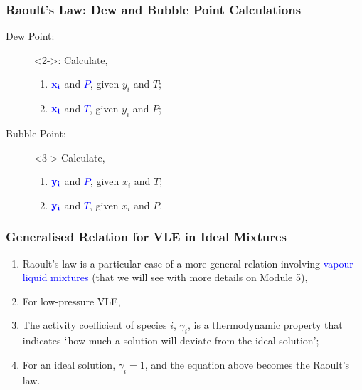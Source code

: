 \documentclass[10pt,compress,handout,ignorenonframetext,unknownkeysallowed]{beamer}
\begin{document}
\begin{frame}
  \frametitle{Raoult's Law: Dew and Bubble Point Calculations}
  \begin{description}
      \item[Dew Point:]<2->: Calculate, 
           \begin{enumerate}
               \item<2-> $\textcolor{blue}{\bf x_{i}}$ and \textcolor{blue}{$P$}, given $y_{i}$ and $T$;
               \item<2-> $\textcolor{blue}{\bf x_{i}}$ and \textcolor{blue}{$T$}, given $y_{i}$ and $P$;
           \end{enumerate}
      \item[Bubble Point:]<3-> Calculate, 
           \begin{enumerate}
               \item<3-> $\textcolor{blue}{\bf y_{i}}$ and \textcolor{blue}{$P$}, given $x_{i}$ and $T$;
               \item<3-> $\textcolor{blue}{\bf y_{i}}$ and \textcolor{blue}{$T$}, given $x_{i}$ and $P$.
           \end{enumerate}
  \end{description}
\end{frame}

\begin{frame}
  \frametitle{Generalised Relation for VLE in Ideal Mixtures}
  \begin{enumerate}
      \item<1-> Raoult's law is a particular case of a more general relation involving \textcolor{blue}{vapour-liquid mixtures} (that we will see with more details on Module 5),
      \item<3-> For low-pressure VLE,
      \item<4-> The activity  coefficient of species $i$, $\gamma_{i}$, is a thermodynamic property that indicates $\lq$how much a solution will deviate from the ideal solution';
      \item<4-> For an ideal solution, $\gamma_{i}=1$, and the equation above becomes the Raoult's law.  
  \end{enumerate}
\end{frame}
\end{document}
